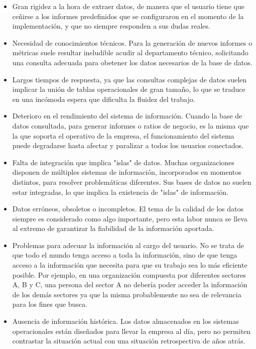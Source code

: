 \documentclass[a4paper,11pt]{article}
\begin{document}
\begin{flushleft}
    \begin{itemize}
      \item Gran rigidez a la hora de extraer datos, de manera que el usuario tiene que ceñirse a los informes predefinidos que se configuraron en el
      momento de la implementación, y que no siempre responden a sus dudas reales.
      \item Necesidad de conocimientos técnicos. Para la generación de nuevos informes o métricas suele resultar ineludible acudir al departamento técnico,
      solicitando una consulta adecuada para obetener los datos necesarios de la base de datos.
      \item Largos tiempos de respuesta, ya que las consultas complejas de datos suelen implicar la unión de tablas operacionales de gran tamaño, lo que se
      traduce en una incómoda espera que dificulta la fluidez del trabajo.
      \item Deterioro en el rendimiento del sistema de información. Cuando la base de datos consultada, para generar informes o ratios de negocio, es la
      misma que la que soporta el operativo de la empresa, el funcionamiento del sistema puede degradarse hasta afectar y paralizar a todos los usuarios
      conectados.
      \item Falta de integración que implica "islas" de datos. Muchas organizaciones disponen de múltiples sistemas de información, incorporados en
      momentos distintos, para resolver problemáticas diferentes. Sus bases de datos no suelen estar integradas, lo que implica la existencia de "islas"
      de información.
      \item Datos erróneos, obsoletos o incompletos. El tema de la calidad de los datos siempre es considerado como algo importante, pero esta labor nunca
      se lleva al extremo de garantizar la fiabilidad de la información aportada.
      \item Problemas para adecuar la información al cargo del usuario. No se trata de que todo el mundo tenga acceso a toda la información, sino de que
      tenga acceso a la información que necesita para que su trabajo sea lo más eficiente posible. Por ejemplo, en una organización compuesta por
      diferentes sectores A, B y C, una persona del sector A no debería poder acceder la información de los demás sectores ya que la misma probablemente
      no sea de relevancia para los fines que busca.
      \item Ausencia de información histórica. Los datos almacenados en los sistemas operacionales están diseñados para llevar la empresa al día, pero no
      permiten contrastar la situación actual con una situación retrospectiva de años atrás.
    \end{itemize}
    


\end{flushleft}
\end{document}
